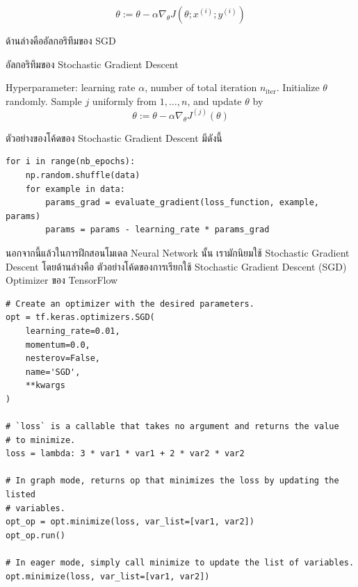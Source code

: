 \begin{equation}\label{eq:sgd}
    \theta := \theta - \alpha\nabla_\theta J( \theta; x^{(i)}; y^{(i)})
\end{equation}

\noindent ด้านล่างคืออัลกอริทึมของ SGD

\begin{algorithm}[H]
    \caption{อัลกอริทึมของ Stochastic Gradient Descent}
    \label{alg:sgd}
    \begin{algorithmic}
    \State Hyperparameter: learning rate $\alpha$, number of total iteration $n_\text{iter}$.
    \State Initialize $\theta$ randomly.
        \State Sample $j$ uniformly from ${1,\ldots,n}$, and update $\theta$ by
        \begin{equation*}
            \theta := \theta - \alpha\nabla_\theta J^{(j)}(\theta)
        \end{equation*}
    \EndFor
    \end{algorithmic}
\end{algorithm}

\noindent ตัวอย่างของโค้ดของ Stochastic Gradient Descent มีดังนี้

\begin{lstlisting}[style=MyPython]
for i in range(nb_epochs):
    np.random.shuffle(data)
    for example in data:
        params_grad = evaluate_gradient(loss_function, example, params)
        params = params - learning_rate * params_grad
\end{lstlisting}

\noindent นอกจากนี้แล้วในการฝึกสอนโมเดล Neural Network นั้น เรามักนิยมใช้ Stochastic Gradient Descent โดยด้านล่างคือ%
ตัวอย่างโค้ดของการเรียกใช้ Stochastic Gradient Descent (SGD) Optimizer ของ TensorFlow

\begin{lstlisting}[style=MyPython]
# Create an optimizer with the desired parameters.
opt = tf.keras.optimizers.SGD(
    learning_rate=0.01,
    momentum=0.0,
    nesterov=False,
    name='SGD',
    **kwargs
)

# `loss` is a callable that takes no argument and returns the value
# to minimize.
loss = lambda: 3 * var1 * var1 + 2 * var2 * var2

# In graph mode, returns op that minimizes the loss by updating the listed
# variables.
opt_op = opt.minimize(loss, var_list=[var1, var2])
opt_op.run()

# In eager mode, simply call minimize to update the list of variables.
opt.minimize(loss, var_list=[var1, var2])
\end{lstlisting}

